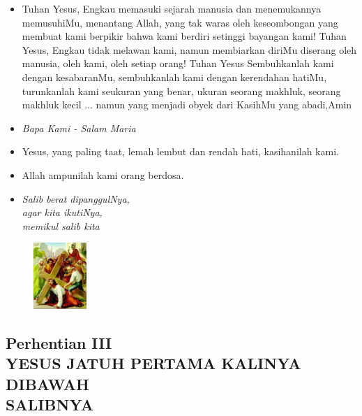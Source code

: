 \documentclass[a5paper,headsepline,titlepage,10pt,nnormalheadings,DIVcalc]{scrbook}
\newcommand{\BU}[1]{\begin{itemize} \item[U:] #1 \end{itemize}}
\newcommand{\BP}[1]{\begin{itemize} \item[P:] #1 \end{itemize}}
\newcommand{\kasihanilahKami}{\BP{Yesus, yang paling taat, lemah lembut dan rendah hati, kasihanilah kami.}
\BU{Allah ampunilah kami orang berdosa.}}
\begin{document}
\BU{Tuhan Yesus, Engkau memasuki sejarah manusia dan menemukannya memusuhiMu, 
menantang Allah, yang tak waras oleh keseombongan yang membuat kami berpikir bahwa kami berdiri setinggi bayangan kami! Tuhan Yesus, Engkau tidak melawan kami, namun membiarkan diriMu diserang oleh manusia, oleh kami, oleh setiap orang! Tuhan Yesus Sembuhkanlah kami dengan kesabaranMu, sembuhkanlah kami dengan kerendahan hatiMu, turunkanlah kami seukuran yang benar, ukuran seorang makhluk, seorang makhluk kecil ... namun yang menjadi obyek dari KasihMu yang abadi,Amin} 



\large\begin{itemize}\item[~]\it{Bapa Kami - Salam Maria}\end{itemize}\normalsize
\kasihanilahKami

\begin{itemize}
\item[3.] \it{Salib berat dipanggulNya,\\ 
	agar kita ikutiNya,\\ 
	memikul salib kita}
\end{itemize}

\begin{figure}
\includegraphics[width=2cm]{jalansalib_files/03_small.jpg}
\end{figure}
\subsection*{Perhentian III\\
YESUS JATUH PERTAMA KALINYA DIBAWAH\\SALIBNYA}
\end{document}
